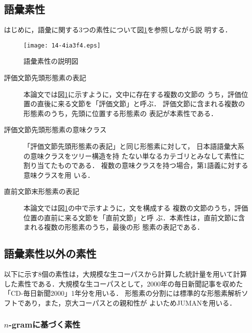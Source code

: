 \documentclass[japanese]{jnlp_1.3e}
\begin{document}
\subsection{語彙素性}

はじめに，語彙に関する3つの素性について図\ref{fig:素性1}を参照しながら説
明する．

\begin{figure}[t]
  \begin{center}
    \texttt{[image: 14-4ia3f4.eps]}
  \end{center}
  \caption{語彙素性の説明図}
  \label{fig:素性1}
 \end{figure}

 \begin{description}
  \item [評価文節先頭形態素の表記]
	      本論文では図\ref{fig:素性1}に示すように，文中に存在する複数の文節の
	      うち，評価位置の直後に来る文節を「評価文節」と呼ぶ．
	      評価文節に含まれる複数の形態素のうち，先頭に位置する形態素の
	      表記が本素性である．
  \item [評価文節先頭形態素の意味クラス]
	      「評価文節先頭形態素の表記」と同じ形態素に対して，
	      日本語語彙大系\cite{語彙大系}の意味クラスをツリー構造を持
	      たない単なるカテゴリとみなして素性に割り当てたものである．
	      複数の意味クラスを持つ場合，第1語義に対する意味クラスを用
	      いる．
  \item [直前文節末形態素の表記]
	      本論文では図\ref{fig:素性1}の中で示すように，文を構成する
	      複数の文節のうち，評価位置の直前に来る文節を「直前文節」と呼
	      ぶ．本素性は，直前文節に含まれる複数の形態素のうち，最後の形
	      態素の表記である．
 \end{description}


\subsection{語彙素性以外の素性}

以下に示す8個の素性は，大規模な生コーパスから計算した統計量を用いて計算
した素性である．大規模な生コーパスとして，2000年の毎日新聞記事を収めた
「CD-毎日新聞2000\cite{mainichi}」1年分を用いる．
形態素の分割には標準的な形態素解析ソフトであり，また，京大コーパスとの親和性が
よいためJUMANを用いる．

\subsubsection{$n$-gramに基づく素性}
\end{document}
